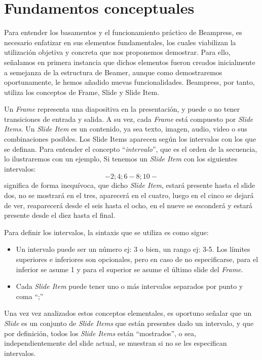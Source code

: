 
\chapter{Fundamentos conceptuales} %
\label{cha:fundamentos_conceptuales}

	Para entender los basamentos y el funcionamiento práctico de Beampress, es necesario enfatizar en sus elementos fundamentales, los cuales viabilizan la utilización objetiva y concreta que nos proponemos demostrar. Para ello, señalamos en primera instancia que dichos elementos fueron creados inicialmente a semejanza de la estructura de Beamer, aunque como demostraremos oportunamente, le hemos añadido nuevas funcionalidades. Beampress, por tanto, utiliza los conceptos de Frame, Slide y Slide Item. 

	Un \textit{Frame} representa una diapositiva en la presentación, y puede o no tener transiciones de entrada y salida. A su vez, cada \textit{Frame} está compuesto por \textit{Slide Items}. Un \textit{Slide Item} es un contenido, ya sea texto, imagen, audio, video o sus combinaciones posibles. Los Slide Items aparecen según los intervalos con los que se definan. Para entender el concepto ``\textit{intervalo}'', que es el orden de la secuencia, lo ilustraremos con un ejemplo, Si tenemos un \textit{Slide Item} con los siguientes intervalos: $$-2;4;6-8;10-$$ significa de forma inequívoca, que dicho \textit{Slide Item}, estará presente hasta el slide dos, no se mostrará en el tres, aparecerá en el cuatro, luego en el cinco se dejará de ver, reaparecerá desde el seis hasta el ocho, en el nueve se esconderá y estará presente desde el diez hasta el final. 

	Para definir los intervalos, la sintaxis que se utiliza es como sigue:
	\begin{itemize}
		\item Un intervalo puede ser un número ej: 3 o bien, un rango ej: 3-5. Los límites superiores e inferiores son opcionales, pero en caso de no especificarse, para el inferior se asume 1 y para el superior se asume el último slide del \textit{Frame}.
		\item Cada \textit{Slide Item} puede tener uno o más intervalos separados por punto y coma ``;''
	\end{itemize}

	Una vez vez analizados estos conceptos elementales, es oportuno señalar que un \textit{Slide} es un conjunto de \textit{Slide Items} que están presentes dado un intervalo, y que por definición, todos los \textit{Slide Items} están ``mostrados'', o sea, independientemente del slide actual, se muestran si no se les especifican intervalos.

